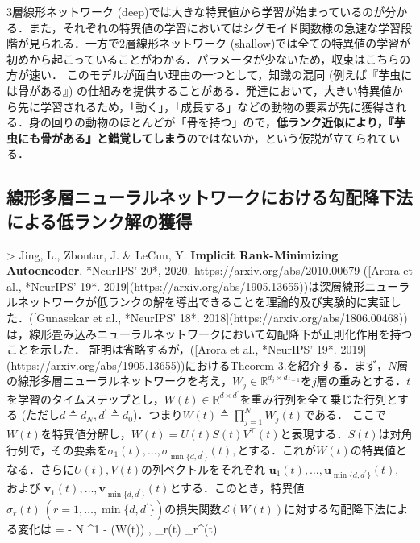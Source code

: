 3層線形ネットワーク (deep)では大きな特異値から学習が始まっているのが分かる．また，それぞれの特異値の学習においてはシグモイド関数様の急速な学習段階が見られる．一方で2層線形ネットワーク (shallow)では全ての特異値の学習が初めから起こっていることがわかる．パラメータが少ないため，収束はこちらの方が速い．
このモデルが面白い理由の一つとして，知識の混同 (例えば『芋虫には骨がある』) の仕組みを提供することがある．発達において，大きい特異値から先に学習されるため，「動く」，「成長する」などの動物の要素が先に獲得される．身の回りの動物のほとんどが「骨を持つ」ので，\textbf{低ランク近似により，『芋虫にも骨がある』と錯覚してしまう}のではないか，という仮説が立てられている．
\subsection{線形多層ニューラルネットワークにおける勾配降下法による低ランク解の獲得}
> Jing, L., Zbontar, J. & LeCun, Y. \textbf{Implicit Rank-Minimizing Autoencoder}. *NeurIPS' 20*, 2020. \url{https://arxiv.org/abs/2010.00679}
([Arora et al., *NeurIPS' 19*. 2019](https://arxiv.org/abs/1905.13655))は深層線形ニューラルネットワークが低ランクの解を導出できることを理論的及び実験的に実証した．([Gunasekar et al., *NeurIPS' 18*. 2018](https://arxiv.org/abs/1806.00468))は，線形畳み込みニューラルネットワークにおいて勾配降下が正則化作用を持つことを示した．
証明は省略するが，([Arora et al., *NeurIPS' 19*. 2019](https://arxiv.org/abs/1905.13655))におけるTheorem 3.を紹介する．まず，$N$層の線形多層ニューラルネットワークを考え，$W_j \in \mathbb{R}^{d_j \times d_{j−1}}$を$j$層の重みとする．$t$を学習のタイムステップとし，$W(t) \in \mathbb{R}^{d \times d^\prime}$を重み行列を全て乗じた行列とする (ただし$d \triangleq d_N, d^\prime \triangleq d_0$)．つまり$W(t)\triangleq\prod_{j=1}^N W_j(t)$である．
ここで$W(t)$を特異値分解し，$W(t) = U(t)S(t)V^\top(t)$と表現する．$S(t)$は対角行列で，その要素を$\sigma_1(t), \ldots , \sigma_{\min\{d, d^\prime\}}(t),$とする．これが$W(t)$の特異値となる．さらに$U(t), V (t)$の列ベクトルをそれぞれ $\mathbf{u}_1(t), \ldots, \mathbf{u}_{\min\{d, d^\prime\}}(t)$, および $\mathbf{v}_1(t), \ldots, \mathbf{v}_{\min\{d,d^\prime \}}(t)$とする．このとき，特異値$ \sigma_r(t)\ (r=1, \ldots, \min\{d,d^\prime \})$の損失関数$\mathcal{L}(W(t))$に対する勾配降下法による変化は
 = - N \cdot {}^{1 - } \cdot \left\langle \nabla {}(W(t)) , _r(t) _r^\top(t) \right\rangle
